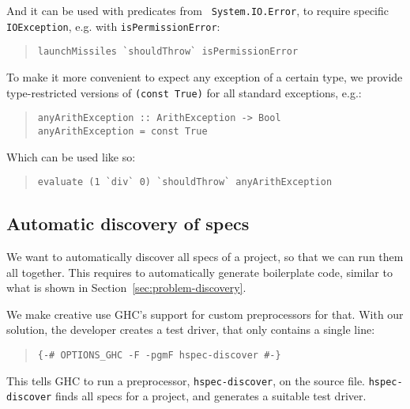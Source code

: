 \documentclass[preprint]{sigplanconf}
\begin{document}
\noindent And it can be used with predicates from {\tt
System.IO.Error}, to require specific {\tt IOException}, e.g.  with
{\tt isPermissionError}:

\begin{quote}
\small
\begin{verbatim}
launchMissiles `shouldThrow` isPermissionError
\end{verbatim}
\end{quote}

\noindent To make it more convenient to expect any exception of a
certain type, we provide type-restricted versions of {\tt (const
True)} for all standard exceptions, e.g.:

\begin{quote}
\small
\begin{verbatim}
anyArithException :: ArithException -> Bool
anyArithException = const True
\end{verbatim}
\end{quote}

\noindent Which can be used like so:

\begin{quote}
\small
\begin{verbatim}
evaluate (1 `div` 0) `shouldThrow` anyArithException
\end{verbatim}
\end{quote}


\subsection{Automatic discovery of specs}
\label{sec:solution-discovery}

We want to automatically discover all specs of a project, so that we
can run them all together.  This requires to automatically generate
boilerplate code, similar to what is shown in
Section~\ref{sec:problem-discovery}.

We make creative use GHC's support for custom preprocessors for
that.  With our solution, the developer creates a test driver, that only
contains a single line:

\begin{quote}
\small
\begin{verbatim}
{-# OPTIONS_GHC -F -pgmF hspec-discover #-}
\end{verbatim}
\end{quote}

\noindent This tells GHC to run a preprocessor, \verb|hspec-discover|, on the
source file.  \verb|hspec-discover| finds all specs for a project, and
generates a suitable test driver.
\end{document}
